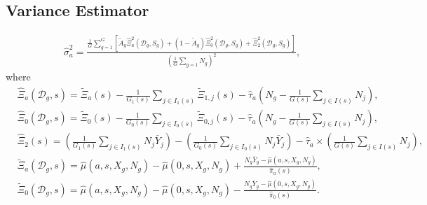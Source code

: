 \documentclass{article}
\begin{document}
\subsection*{Variance Estimator}
\begin{align}
	\hat{\sigma}_a^2 = \frac{\frac{1}{G} \sum_{g=1}^G\left[\tilde{A}_g\hat{\Xi}_{a}^2(\mathcal D_g, S_g) + (1-\tilde{A}_g) \hat{\Xi}_{0}^2(\mathcal D_g, S_g) + \hat{\Xi}_2^2(\mathcal D_g, S_g) \right]}{\left(\frac{1}{G}\sum_{g=1} N_g\right)^2}, \nonumber
\end{align}
where 
\begin{align}
	&\hat{\Xi}_{a}(\mathcal D_g, s) = \tilde{\Xi}_{a}(s) - \frac{1}{G_1(s)} \sum_{j \in I_1(s)} \tilde{\Xi}_{1,j}(s)  - \hat{\tau}_a \left(N_g - \frac{1}{G(s)} \sum_{j \in I(s)} N_j \right)\nonumber, \\
	&\hat{\Xi}_{0}(\mathcal D_g, s) = \tilde{\Xi}_{0}(s) - \frac{1}{G_0(s)} \sum_{j \in I_0(s)} \tilde{\Xi}_{0,j}(s)  - \hat{\tau}_a \left(N_g - \frac{1}{G(s)} \sum_{j \in I(s)} N_j \right)\nonumber , \\
	& \hat{\Xi}_2(s) = \left(\frac{1}{G_1(s)} \sum_{j \in I_1(s)} N_j \bar{Y}_j\right) - \left(\frac{1}{G_0(s)} \sum_{j \in I_0(s)} N_j \bar{Y}_j\right) - \hat{\tau}_a \times \left(\frac{1}{G(s)}\sum_{j \in I(s)} N_j \right), \nonumber \\
	&\tilde{\Xi}_{a}(\mathcal D_g, s) = \hat{\mu}(a,s,X_g,N_g) - \hat{\mu}(0,s,X_g,N_g) + \frac{N_g \bar{Y}_g - \hat{\mu}(a,s,X_g,N_g)}{\hat{\pi}_a(s)}, \nonumber \\
	& \tilde{\Xi}_{0}(\mathcal D_g, s) = \hat{\mu}(a,s,X_g,N_g) - \hat{\mu}(0,s,X_g,N_g) - \frac{N_g \bar{Y}_g - \hat{\mu}(0,s,X_g,N_g)}{\hat{\pi}_0(s)}. \nonumber
	\end{align}
\end{document}
